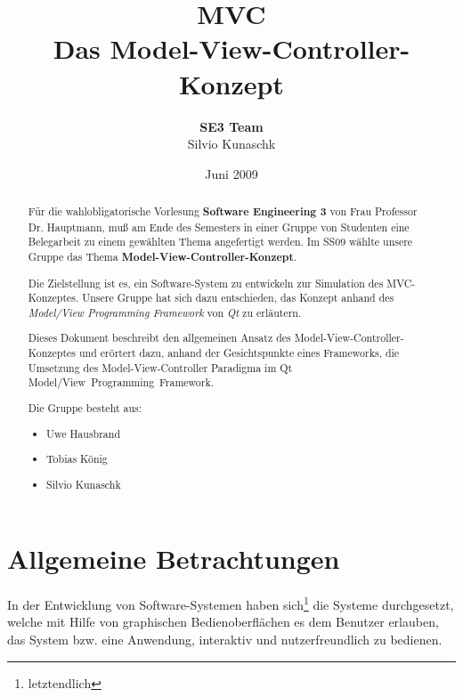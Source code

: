\documentclass[11pt,a4paper,titlepage]{scrreprt}
\begin{document}
\selectlanguage{\german}

\title{{\Huge \bf MVC}\\[0.55em]{\LARGE Das Model-View-Controller-Konzept}}
\author{{\bf SE3 Team}\\Silvio Kunaschk}

\date{Juni 2009}
\maketitle

\begin{abstract}
Für die wahlobligatorische Vorlesung {\bf Software Engineering 3} von
Frau Professor Dr. Hauptmann, muß am Ende des Semesters in einer 
Gruppe von Studenten eine Belegarbeit zu einem gewählten Thema
angefertigt werden. Im SS09 wählte unsere Gruppe das Thema
{\bf Model-View-Controller-Konzept}.\\{\smallskip}

Die Zielstellung ist es, ein Software-System zu entwickeln zur Simulation
des MVC-Konzeptes. Unsere Gruppe hat sich dazu entschieden, das Konzept
anhand des {\itshape Model/View Programming Framework} von {\itshape Qt}
zu erläutern.\\{\smallskip}

Dieses Dokument beschreibt den allgemeinen Ansatz des 
Model-View-Controller-Konzeptes und erörtert dazu, anhand der Gesichtspunkte
eines Frameworks, die Umsetzung des Model-View-Controller Paradigma im
Qt Model/View~Programming~Framework.\\{\bigskip}

Die Gruppe besteht aus:
\begin{itemize}
\item Uwe Hausbrand
\item Tobias König
\item Silvio Kunaschk
\end{itemize}

\end{abstract}

\tableofcontents

\chapter{Allgemeine Betrachtungen}
In der Entwicklung von Software-Systemen haben sich\footnote{letztendlich} die Systeme durchgesetzt, 
welche mit Hilfe von graphischen Bedienoberflächen es dem Benutzer erlauben, das System
bzw. eine Anwendung, interaktiv und nutzerfreundlich zu bedienen.\\
\end{document}
